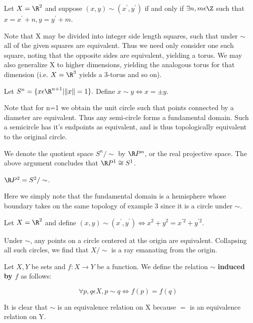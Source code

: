 \begin{example}
Let $X = \R^{2}$ and suppose $(x,y)\sim(x^{'},y^{'})$ if and only if $\exists n,m \epsilon \Z$ such that $x = x^{'} + n, y = y^{'} + m$. 
\end{example}

Note that X may be divided into integer side length squares, such that under $\sim$ all of the given squares are equivalent.  Thus we need only consider one such square, noting that the opposite sides are equivalent, yielding a torus.  We may also generalize X to higher dimensions, yielding the analogous torus for that dimension (i.e. $X = \R^{3}$ yields a 3-torus and so on).
\placeholder

\begin{example}
 Let $S^{n} = \{x \epsilon \R^{n+1}| \|x\| = 1\}.$ Define $x \sim y \Leftrightarrow x =  \pm y$.
 \end{example}

Note that for n=1 we obtain the unit circle such that points connected by a diameter are equivalent.  Thus any semi-circle forms a fundamental domain.  Such a semicircle has it's endpoints as equivalent, and is thus topologically equivalent to the original circle.

We denote the quotient space $S^{n}/\sim$ by $\R P^{n}$, or the real projective space.  The above argument concludes that $\R P^{1} \cong S^{1}$.
\placeholder

\begin{example} $\R P^{2} = S^{2}/\sim$.

Here we simply note that the fundamental domain is a hemisphere whose boundary takes on the same topology of example 3 since it is a circle under $\sim$.
\end{example}


\begin{example}
 Let $X=\R^{2}$ and define $(x,y)\sim(x^{'},y^{'}) \Leftrightarrow x^{2}+y^{2}=x^{'2}+y^{'2}$.

Under $\sim$, any points on a circle centered at the origin are equivalent.  Collapsing all such circles, we find that $X/\sim$ is a ray emanating from the origin.
\placeholder
\end{example}


\begin{definition}
 Let $X,Y$ be sets and $f: X \to Y$ be a function. We define the relation $\sim$ {\bf induced by $f$} as follows:

\[\forall p,q \epsilon X, p \sim q \Leftrightarrow f(p)=f(q)\]

It is clear that $\sim$ is an equivalence relation on X because $=$ is an equivalence relation on Y.
\end{definition}

